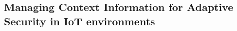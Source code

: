 \documentclass[tid,table]{texufpel} %
\begin{document}




\subsection{Managing Context Information for Adaptive Security in IoT environments} %
\end{document}
